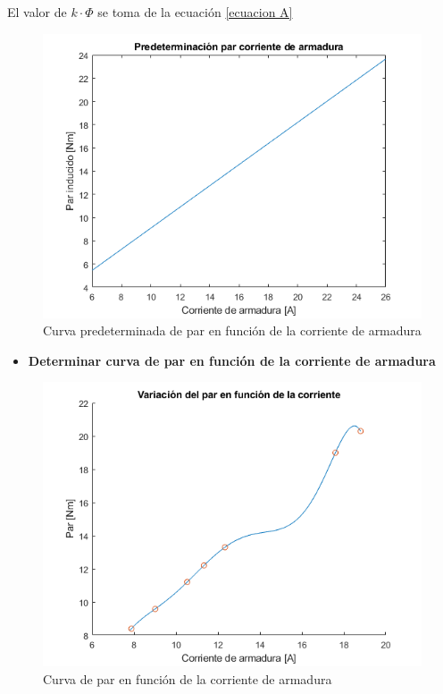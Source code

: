 \documentclass[11pt,letterpaper]{article}     %
\begin{document}
	El valor de $k\cdot \Phi$ se toma de la ecuación \ref{ecuacion A} 
	\begin{figure}[H]
	\centering
	\includegraphics[scale=0.8]{./recursos-Lab6/curvaPredeterminarParCorrienteArmadura.png}
	\caption{Curva predeterminada de par en función de la corriente de armadura}
	\label{fig:CurvaPredeterminarDeParCorriente}
\end{figure}
\begin{itemize}
	\item \textbf{Determinar curva de par en función de la corriente de armadura}
\end{itemize}
	
	\begin{figure}[H]
	\centering
	\includegraphics[scale=0.8]{./recursos-Lab6/curvaParCorrienteDeArmadura.png}
	\caption{Curva de par en función de la corriente de armadura}
	\label{fig:CurvaDeParCorriente}
\end{figure}
	
\end{document}
